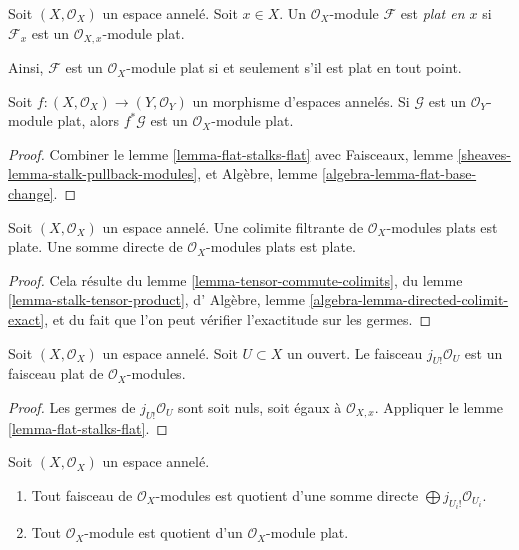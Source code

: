 \begin{definition}
\label{definition-flat-at-point}
Soit $(X, \mathcal{O}_X)$ un espace annelé. Soit $x \in X$.
Un $\mathcal{O}_X$-module $\mathcal{F}$ est
{\it plat en $x$} si $\mathcal{F}_x$ est un
$\mathcal{O}_{X, x}$-module plat.
\end{definition}

\noindent
Ainsi, $\mathcal{F}$ est un $\mathcal{O}_X$-module plat
si et seulement s'il est plat en tout point.

\begin{lemma}
\label{lemma-base-change-flat}
Soit $f : (X, \mathcal{O}_X) \to (Y, \mathcal{O}_Y)$
un morphisme d'espaces annelés. Si $\mathcal{G}$ est un
$\mathcal{O}_Y$-module plat, alors $f^*\mathcal{G}$ est un
$\mathcal{O}_X$-module plat.
\end{lemma}

\begin{proof}
Combiner le lemme \ref{lemma-flat-stalks-flat} avec
Faisceaux, lemme \ref{sheaves-lemma-stalk-pullback-modules}, et
Algèbre, lemme \ref{algebra-lemma-flat-base-change}.
\end{proof}

\begin{lemma}
\label{lemma-colimits-flat}
Soit $(X, \mathcal{O}_X)$ un espace annelé.
Une colimite filtrante de $\mathcal{O}_X$-modules plats est plate.
Une somme directe de $\mathcal{O}_X$-modules plats est plate.
\end{lemma}

\begin{proof}
Cela résulte du
lemme \ref{lemma-tensor-commute-colimits}, du
lemme \ref{lemma-stalk-tensor-product}, d'
Algèbre, lemme \ref{algebra-lemma-directed-colimit-exact},
et du fait que l'on peut vérifier l'exactitude sur les germes.
\end{proof}

\begin{lemma}
\label{lemma-j-shriek-flat}
Soit $(X, \mathcal{O}_X)$ un espace annelé.
Soit $U \subset X$ un ouvert. Le faisceau $j_{U!}\mathcal{O}_U$
est un faisceau plat de $\mathcal{O}_X$-modules.
\end{lemma}

\begin{proof}
Les germes de $j_{U!}\mathcal{O}_U$ sont soit nuls, soit égaux
à $\mathcal{O}_{X, x}$. Appliquer le
lemme \ref{lemma-flat-stalks-flat}.
\end{proof}

\begin{lemma}
\label{lemma-module-quotient-flat}
Soit $(X, \mathcal{O}_X)$ un espace annelé.
\begin{enumerate}
\item Tout faisceau de $\mathcal{O}_X$-modules est quotient d'une
somme directe $\bigoplus j_{U_i!}\mathcal{O}_{U_i}$.
\item Tout $\mathcal{O}_X$-module est quotient d'un
$\mathcal{O}_X$-module plat.
\end{enumerate}
\end{lemma}

